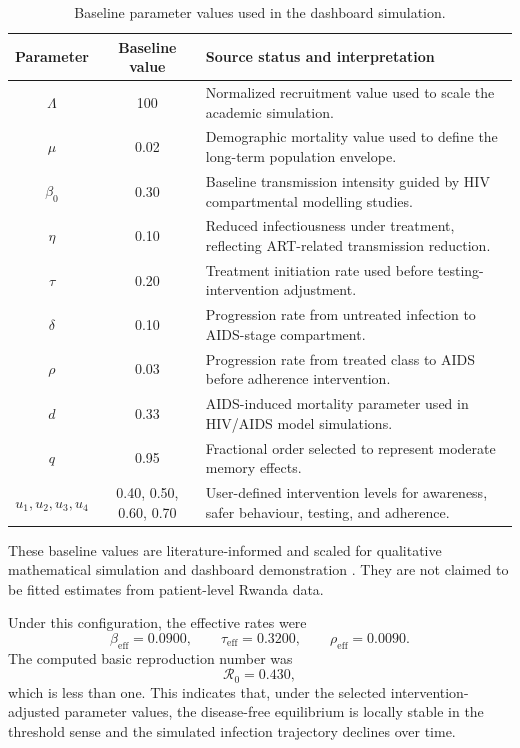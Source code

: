 \documentclass[12pt,a4paper,oneside]{report}
\begin{document}
\begin{table}[H]
\centering
\caption{Baseline parameter values used in the dashboard simulation.}
\label{tab:baseline_parameter_values}
\small
\begin{tabularx}{\textwidth}{c c X}
\toprule
Parameter & Baseline value & Source status and interpretation\\
\midrule
$\Lambda$ & 100 & Normalized recruitment value used to scale the academic simulation.\\
$\mu$ & 0.02 & Demographic mortality value used to define the long-term population envelope.\\
$\beta_0$ & 0.30 & Baseline transmission intensity guided by HIV compartmental modelling studies.\\
$\eta$ & 0.10 & Reduced infectiousness under treatment, reflecting ART-related transmission reduction.\\
$\tau$ & 0.20 & Treatment initiation rate used before testing-intervention adjustment.\\
$\delta$ & 0.10 & Progression rate from untreated infection to AIDS-stage compartment.\\
$\rho$ & 0.03 & Progression rate from treated class to AIDS before adherence intervention.\\
$d$ & 0.33 & AIDS-induced mortality parameter used in HIV/AIDS model simulations.\\
$q$ & 0.95 & Fractional order selected to represent moderate memory effects.\\
$u_1,u_2,u_3,u_4$ & 0.40, 0.50, 0.60, 0.70 & User-defined intervention levels for awareness, safer behaviour, testing, and adherence.\\
\bottomrule
\end{tabularx}
\end{table}

These baseline values are literature-informed and scaled for qualitative mathematical simulation and dashboard demonstration \citep{AndersonMay1991,SilvaTorres2017,Gunerhan2020,Unaegbu2021,RBC2020RPHIA}. They are not claimed to be fitted estimates from patient-level Rwanda data.

Under this configuration, the effective rates were
\[
\beta_{\mathrm{eff}}=0.0900,\qquad
\tau_{\mathrm{eff}}=0.3200,\qquad
\rho_{\mathrm{eff}}=0.0090.
\]
The computed basic reproduction number was
\[
\mathcal{R}_0=0.430,
\]
which is less than one. This indicates that, under the selected intervention-adjusted parameter values, the disease-free equilibrium is locally stable in the threshold sense and the simulated infection trajectory declines over time.
\end{document}
